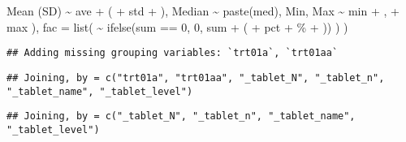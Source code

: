 \documentclass[
]{article}
\newenvironment{Shaded}{\begin{snugshade}}{\end{snugshade}}
\newcommand{\AttributeTok}[1]{\textcolor[rgb]{0.77,0.63,0.00}{#1}}
\newcommand{\DecValTok}[1]{\textcolor[rgb]{0.00,0.00,0.81}{#1}}
\newcommand{\FunctionTok}[1]{\textcolor[rgb]{0.00,0.00,0.00}{#1}}
\newcommand{\NormalTok}[1]{#1}
\newcommand{\SpecialCharTok}[1]{\textcolor[rgb]{0.00,0.00,0.00}{#1}}
\newcommand{\StringTok}[1]{\textcolor[rgb]{0.31,0.60,0.02}{#1}}
\begin{document}
\begin{Shaded}
\begin{Highlighting}[]
      \StringTok{\textasciigrave{}}\AttributeTok{Mean (SD)}\StringTok{\textasciigrave{}} \SpecialCharTok{\textasciitilde{}}\NormalTok{  ave }\SpecialCharTok{+} \StringTok{\textquotesingle{} (\textquotesingle{}} \SpecialCharTok{+}\NormalTok{ std }\SpecialCharTok{+} \StringTok{\textquotesingle{})\textquotesingle{}}\NormalTok{,}
\NormalTok{      Median }\SpecialCharTok{\textasciitilde{}}  \FunctionTok{paste}\NormalTok{(med),}
      \StringTok{\textasciigrave{}}\AttributeTok{Min, Max}\StringTok{\textasciigrave{}} \SpecialCharTok{\textasciitilde{}}\NormalTok{  min }\SpecialCharTok{+} \StringTok{\textquotesingle{}, \textquotesingle{}} \SpecialCharTok{+}\NormalTok{ max}
\NormalTok{    ),}
    \AttributeTok{fac =} \FunctionTok{list}\NormalTok{(}
      \StringTok{\textasciigrave{}}\AttributeTok{ }\StringTok{\textasciigrave{}} \SpecialCharTok{\textasciitilde{}} \FunctionTok{ifelse}\NormalTok{(sum }\SpecialCharTok{==} \DecValTok{0}\NormalTok{, }\StringTok{\textquotesingle{}0\textquotesingle{}}\NormalTok{, sum }\SpecialCharTok{+} \StringTok{\textquotesingle{} (\textquotesingle{}} \SpecialCharTok{+}\NormalTok{ pct }\SpecialCharTok{+} \StringTok{\textquotesingle{}\%\textquotesingle{}} \SpecialCharTok{+} \StringTok{\textquotesingle{})\textquotesingle{}}\NormalTok{)}
\NormalTok{    )}
\NormalTok{  )}
\end{Highlighting}
\end{Shaded}

\begin{verbatim}
## Adding missing grouping variables: `trt01a`, `trt01aa`
\end{verbatim}

\begin{verbatim}
## Joining, by = c("trt01a", "trt01aa", "_tablet_N", "_tablet_n", "_tablet_name", "_tablet_level")
\end{verbatim}

\begin{verbatim}
## Joining, by = c("_tablet_N", "_tablet_n", "_tablet_name", "_tablet_level")
\end{verbatim}
\end{document}
